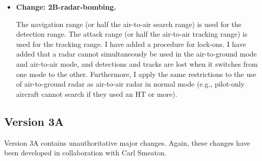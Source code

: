 \documentclass[10pt]{report}
\newcommand{\itemtag}[1]{\item \textbf{Change: #1.}\par}
\begin{document}
\begin{itemize}
    \itemtag{2B-radar-bombing} The navigation range (or half the air-to-air search range) is used for the detection range. The attack range (or half the air-to-air tracking range) is used for the tracking range. I have added a procedure for lock-ons. I have added that a radar cannot simultaneously be used in the air-to-ground mode and air-to-air mode, and detections and tracks are lost when it switches from one mode to the other. Furthermore, I apply the same restrictions to the use of air-to-ground radar as air-to-air radar in normal mode (e.g., pilot-only aircraft cannot search if they used an HT or more).

\end{itemize}

\subsection{Version 3A}

Version 3A contains unauthoritative major changes. Again, these changes have been developed in collaboration with Carl Smeaton.
\end{document}
